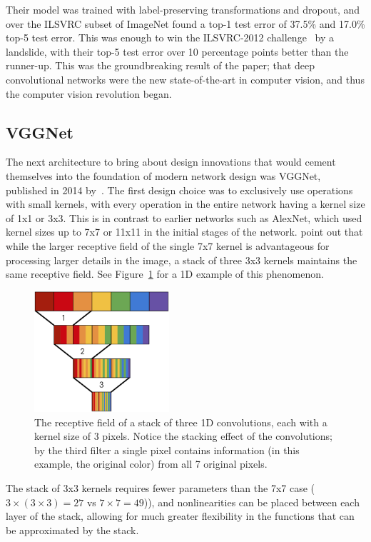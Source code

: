 Their model was trained with label-preserving transformations and dropout, and over the ILSVRC subset of ImageNet found
a top-1 test error of 37.5\% and 17.0\% top-5 test error. This was enough to win the ILSVRC-2012 challenge~\citep{deng2009} by a landslide,
with their top-5 test error over 10 percentage points better than the runner-up. This was the groundbreaking result of the
paper; that deep convolutional networks were the new state-of-the-art in computer vision, and thus the computer vision
revolution began.

\subsection{VGGNet}
The next architecture to bring about design innovations that would cement themselves into the foundation of modern
network design was VGGNet, published in 2014 by~\citeauthor{simon2014}. The first design
choice was to exclusively use operations with small kernels, with every operation in the entire network having a kernel
size of 1x1 or 3x3. This is in contrast to earlier networks such as AlexNet, which used kernel sizes up to 7x7 or 11x11
in the initial stages of the network. \citeauthor{simon2014} point out that while the larger receptive field of the
single 7x7 kernel is advantageous for processing larger details in the image, a stack of three 3x3 kernels maintains
the same receptive field. See Figure~\ref{fig:receptive} for a 1D example of this phenomenon.

\begin{figure}[h]
    \center
    \includegraphics[width=5cm]{receptive}
    \caption[The receptive field of stacked convolutions]{The receptive field of a stack of three 1D convolutions, each with a kernel size of 3 pixels. Notice
    the stacking effect of the convolutions; by the third filter a single pixel contains information (in this example,
        the original color) from all 7 original pixels.}
    \label{fig:receptive}
\end{figure}

The stack of 3x3 kernels requires fewer parameters than the 7x7 case ($3\times(3\times 3)=27$ vs $7\times7=49$)), and nonlinearities
can be placed between each layer of the stack, allowing for much greater flexibility in the functions that can be
approximated by the stack.

